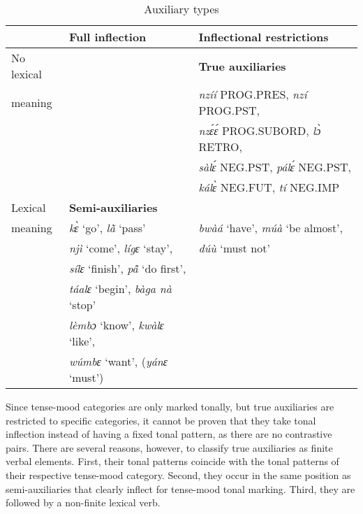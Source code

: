 \begin{table}[!h]
\centering
\begin{tabular}{l|l|l}
			& 	Full inflection 	& Inflectional restrictions \\
 \midrule
No lexical  & 	& {\bfseries True auxiliaries} \\
	meaning	& 		        & {\itshape nzíí} PROG.PRES, {\itshape nzí} PROG.PST, \\
				& 			& {\itshape nzɛ́ɛ́} PROG.SUBORD, {\itshape lɔ̀} RETRO, \\
				& 			& {\itshape sàlɛ́} NEG.PST, {\itshape pálɛ́} NEG.PST, \\
				& 			& 	{\itshape kálɛ̀} NEG.FUT, {\itshape tí} NEG.IMP  \\   \midrule
Lexical  & {\bfseries Semi-auxiliaries} & \\
meaning	& 	{\itshape kɛ̀} `go', {\itshape lã̀} `pass'                 &  {\itshape bwàá} `have', {\itshape múà} `be almost',    \\
			&   {\itshape njì} `come', {\itshape lígɛ} `stay',	& 	{\itshape dúù} `must not' \\
			&  {\itshape sílɛ} `finish', {\itshape pã̂} `do first',   & 	\\
			&  {\itshape táalɛ} `begin', {\itshape bàga nà} `stop' &    \\
                           & {\itshape lèmbɔ} `know', {\itshape kwàlɛ} `like',  & 	\\
			& {\itshape wúmbɛ} `want', ({\itshape yánɛ} `must')    & 	\\
\end{tabular}
\caption{Auxiliary types}
\label{Tab:AUX}
\end{table}


Since tense-mood categories are only marked tonally, but true auxiliaries are restricted to specific categories, it cannot be proven that they take tonal inflection instead of having a fixed tonal pattern, as there are no contrastive pairs. There are several reasons, however, to classify true auxiliaries as finite verbal elements. First, their tonal patterns coincide with the tonal patterns of their respective tense-mood category. Second, they occur in the same position as semi-auxiliaries that clearly inflect for tense-mood tonal marking. Third, they are followed by a non-finite lexical verb.


